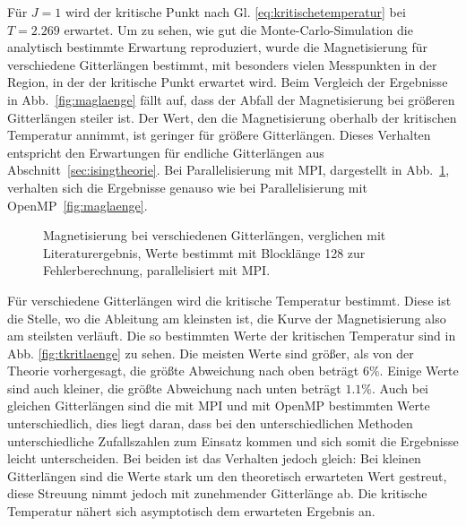 	
	Für $J=1$ wird der kritische Punkt nach Gl. \ref{eq:kritischetemperatur} bei $T=\num{2,269}$ erwartet.
	Um zu sehen, wie gut die Monte-Carlo-Simulation die analytisch bestimmte Erwartung reproduziert, wurde die Magnetisierung für verschiedene Gitterlängen bestimmt, mit besonders vielen Messpunkten in der Region, in der der kritische Punkt erwartet wird. Beim Vergleich der Ergebnisse in Abb.~\ref{fig:maglaenge} fällt auf, dass der Abfall der Magnetisierung bei größeren Gitterlängen steiler ist. Der Wert, den die Magnetisierung oberhalb der kritischen Temperatur annimmt, ist geringer für größere Gitterlängen. Dieses Verhalten entspricht den Erwartungen für endliche Gitterlängen aus Abschnitt~\ref{sec:isingtheorie}. Bei Parallelisierung mit MPI, dargestellt in Abb.~\ref{fig:maglaengempi}, verhalten sich die Ergebnisse genauso wie bei Parallelisierung mit OpenMP~\ref{fig:maglaenge}.
	
	
	\begin{figure}[htbp]
		
		\caption[Magnetisierung bei verschiedenen Gitterlängen und Verwendung von MPI]{Magnetisierung bei verschiedenen Gitterlängen, verglichen mit Literaturergebnis, Werte bestimmt mit Blocklänge 128 zur Fehlerberechnung, parallelisiert mit MPI.}
		\label{fig:maglaengempi}
	\end{figure}

	Für verschiedene Gitterlängen wird die kritische Temperatur bestimmt. Diese ist die Stelle, wo die Ableitung am kleinsten ist, die Kurve der Magnetisierung also am steilsten verläuft. Die so bestimmten Werte der kritischen Temperatur sind in Abb. \ref{fig:tkritlaenge} zu sehen. Die meisten Werte sind größer, als von der Theorie vorhergesagt, die größte Abweichung nach oben beträgt 6\%. Einige Werte sind auch kleiner, die größte Abweichung nach unten beträgt $\num{1,1}\%$. Auch bei gleichen Gitterlängen sind die mit MPI und mit OpenMP bestimmten Werte unterschiedlich, dies liegt daran, dass bei den unterschiedlichen Methoden unterschiedliche Zufallszahlen zum Einsatz kommen und sich somit die Ergebnisse leicht unterscheiden. Bei beiden ist das Verhalten jedoch gleich: Bei kleinen Gitterlängen sind die Werte stark um den theoretisch erwarteten Wert gestreut, diese Streuung nimmt jedoch mit zunehmender Gitterlänge ab. Die kritische Temperatur nähert sich asymptotisch dem erwarteten Ergebnis an.
	
